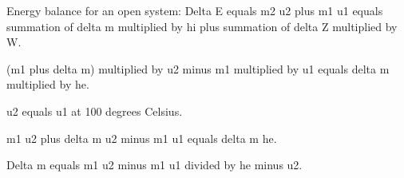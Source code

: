 Energy balance for an open system:  
Delta E equals m2 u2 plus m1 u1 equals summation of delta m multiplied by hi plus summation of delta Z multiplied by W.  

(m1 plus delta m) multiplied by u2 minus m1 multiplied by u1 equals delta m multiplied by he.  

u2 equals u1 at 100 degrees Celsius.  

m1 u2 plus delta m u2 minus m1 u1 equals delta m he.  

Delta m equals m1 u2 minus m1 u1 divided by he minus u2.